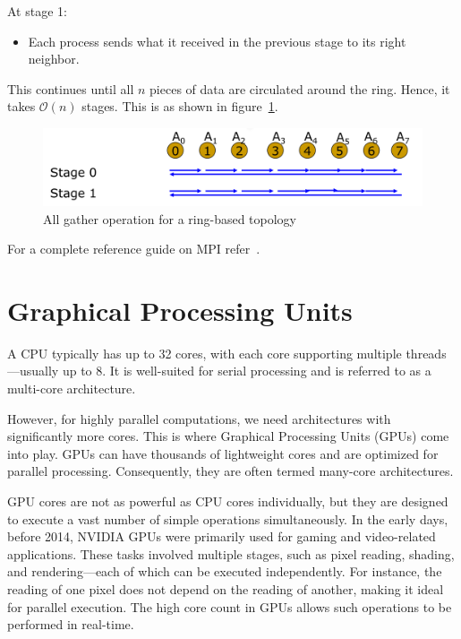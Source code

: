 \documentclass[12pt]{book}
\begin{document}
At stage 1:
\begin{itemize}
    \item Each process sends what it received in the previous stage to its right neighbor.
\end{itemize}

This continues until all $n$ pieces of data are circulated around the ring. Hence, it takes $\mathcal{O}(n)$ stages. This is as shown in figure~\ref{fig:allgather_examp}.
\begin{figure}[ht]
    \centering
    \includegraphics[width=0.75\linewidth]{images/allgather_examp.png}
    \caption{All gather operation for a ring-based topology}
    \label{fig:allgather_examp}
\end{figure}



For a complete reference guide on MPI refer~\cite{snir1998mpi}.

\chapter{Graphical Processing Units}

A CPU typically has up to 32 cores, with each core supporting multiple threads—usually up to 8. It is well-suited for serial processing and is referred to as a multi-core architecture.

However, for highly parallel computations, we need architectures with significantly more cores. This is where Graphical Processing Units (GPUs) come into play. GPUs can have thousands of lightweight cores and are optimized for parallel processing. Consequently, they are often termed many-core architectures.

GPU cores are not as powerful as CPU cores individually, but they are designed to execute a vast number of simple operations simultaneously. In the early days, before 2014, NVIDIA GPUs were primarily used for gaming and video-related applications. These tasks involved multiple stages, such as pixel reading, shading, and rendering—each of which can be executed independently. For instance, the reading of one pixel does not depend on the reading of another, making it ideal for parallel execution. The high core count in GPUs allows such operations to be performed in real-time.
\end{document}
